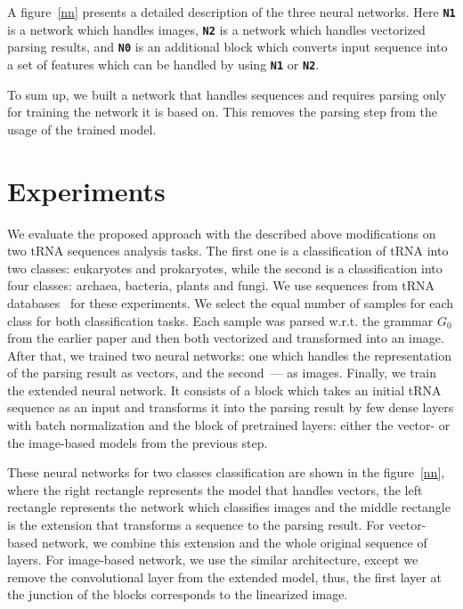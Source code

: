 \documentclass[12pt,a4paper]{cibb}
\begin{document}
A figure~\ref{nn} presents a detailed description of the three neural networks.
Here \textbf{\texttt{N1}} is a network which handles images, \textbf{\texttt{N2}} is a network which handles vectorized parsing results, and \textbf{\texttt{N0}} is an additional block which converts input sequence into a set of features which can be handled by using \textbf{\texttt{N1}} or \textbf{\texttt{N2}}.

To sum up, we built a network that handles sequences and requires parsing only for training the network it is based on.
This removes the parsing step from the usage of the trained model.


\section{\bf Experiments}

We evaluate the proposed approach with the described above modifications on two tRNA sequences analysis tasks.
The first one is a classification of tRNA into two classes: eukaryotes and prokaryotes, while the second is a classification into four classes: archaea, bacteria, plants and fungi.
We use sequences from tRNA databases~\cite{trnadb1,trnadb2} for these experiments.
We select the equal number of samples for each class for both classification tasks.
Each sample was parsed w.r.t. the grammar $G_0$ from the earlier paper and then both vectorized and transformed into an image.
After that, we trained two neural networks: one which handles the representation of the parsing result as vectors, and the second~--- as images.
Finally, we train the extended neural network.
It consists of a block which takes an initial tRNA sequence as an input and transforms it into the parsing result by few dense layers with batch normalization and the block of pretrained layers: either the vector- or the image-based models from the previous step.

These neural networks for two classes classification are shown in the figure~\ref{nn}, where the right rectangle represents the model that handles vectors, the left rectangle represents the network which classifies images and the middle rectangle is the extension that transforms a sequence to the parsing result.
For vector-based network, we combine this extension and the whole original sequence of layers.
For image-based network, we use the similar architecture, except we remove the convolutional layer from the extended model, thus, the first layer at the junction of the blocks corresponds to the linearized image.
\end{document}
